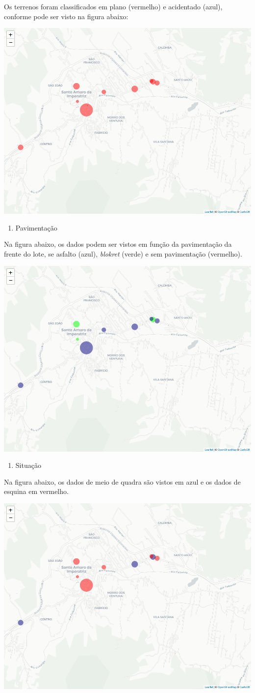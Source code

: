 \documentclass[]{article}
\providecommand{\tightlist}{%
  \setlength{\itemsep}{0pt}\setlength{\parskip}{0pt}}
\begin{document}
Os terrenos foram classificados em plano (vermelho) e acidentado (azul),
conforme pode ser visto na figura abaixo:

\begin{center}\includegraphics[width=0.5\linewidth]{Report_files/figure-latex/mapa1-1} \end{center}

\begin{enumerate}
\def\labelenumi{\alph{enumi}.}
\setcounter{enumi}{1}
\tightlist
\item
  Pavimentação
\end{enumerate}

Na figura abaixo, os dados podem ser vistos em função da pavimentação da
frente do lote, se asfalto (azul), \emph{blokret} (verde) e sem
pavimentação (vermelho).

\begin{center}\includegraphics[width=0.5\linewidth]{Report_files/figure-latex/mapa2-1} \end{center}

\begin{enumerate}
\def\labelenumi{\alph{enumi}.}
\setcounter{enumi}{2}
\tightlist
\item
  Situação
\end{enumerate}

Na figura abaixo, os dados de meio de quadra são vistos em azul e os
dados de esquina em vermelho.

\begin{center}\includegraphics[width=0.5\linewidth]{Report_files/figure-latex/mapa3-1} \end{center}
\end{document}

